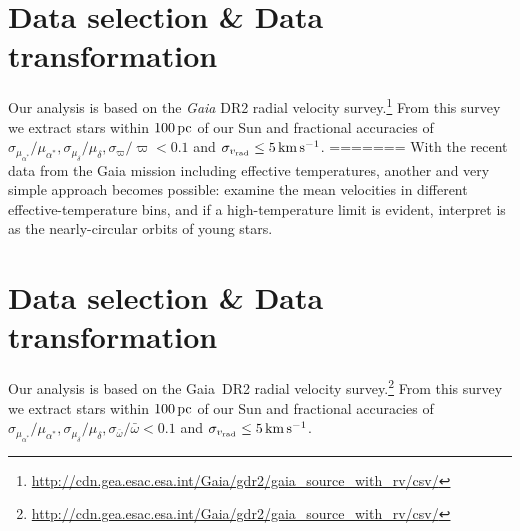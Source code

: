 \documentclass{aastex62}
\begin{document}
\section{Data selection \& Data transformation} 

Our analysis is based on the \textit{Gaia} DR2 radial velocity survey.\footnote{\url{http://cdn.gea.esac.esa.int/Gaia/gdr2/gaia_source_with_rv/csv/}}  From this survey we extract stars within $100\rm\,pc$ of our Sun and fractional accuracies of $\sigma_{\mu_{\alpha^*}}/\mu_{\alpha^*},\sigma_{\mu_\delta}/\mu_\delta,\sigma_{\varpi}/\varpi<0.1$ and $\sigma_{v_{\rm rad}}\leq 5\rm\,km\,s^{-1}$.
\noindent
=======
With the recent data from the Gaia mission including effective temperatures, another and very simple approach becomes possible: examine the mean velocities in different effective-temperature bins, and if a high-temperature limit is evident, interpret is as the nearly-circular orbits of young stars.
	
\section{Data selection \& Data transformation} 

Our analysis is based on the Gaia~DR2 radial velocity survey.\footnote{\url{http://cdn.gea.esac.esa.int/Gaia/gdr2/gaia_source_with_rv/csv/}}  From this survey we extract stars within $100\rm\,pc$ of our Sun and fractional accuracies of $\sigma_{\mu_{\alpha^*}}/\mu_{\alpha^*},\sigma_{\mu_\delta}/\mu_\delta,\sigma_{\bar\omega}/\bar\omega<0.1$ and $\sigma_{v_{\rm rad}}\leq 5\rm\,km\,s^{-1}$.
\end{document}
